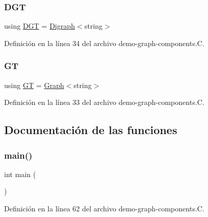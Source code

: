 \subsubsection{\texorpdfstring{D\+GT}{DGT}}
{\footnotesize\ttfamily using \hyperlink{demo-buildgraph_8_c_ae73e956c2a8cf0a58255aa6b659985e0}{D\+GT} =  \hyperlink{class_designar_1_1_digraph}{Digraph}$<$string$>$}



Definición en la línea 34 del archivo demo-\/graph-\/components.\+C.

\mbox{\label{demo-graph-components_8_c_a668102de43ec3f9488fff7b515d48859}} 
\subsubsection{\texorpdfstring{GT}{GT}}
{\footnotesize\ttfamily using \hyperlink{demo-buildgraph_8_c_a3001c40d2c31ca87ed96cd7d1334a55e}{GT} =  \hyperlink{class_designar_1_1_graph}{Graph}$<$string$>$}



Definición en la línea 33 del archivo demo-\/graph-\/components.\+C.



\subsection{Documentación de las funciones}
\mbox{\label{demo-graph-components_8_c_ae66f6b31b5ad750f1fe042a706a4e3d4}} 
\subsubsection{\texorpdfstring{main()}{main()}}
{\footnotesize\ttfamily int main (\begin{DoxyParamCaption}{ }\end{DoxyParamCaption})}



Definición en la línea 62 del archivo demo-\/graph-\/components.\+C.

\mbox{\label{demo-graph-components_8_c_af4aa6ad85cbef3cd03726e2b31004df6}} 
